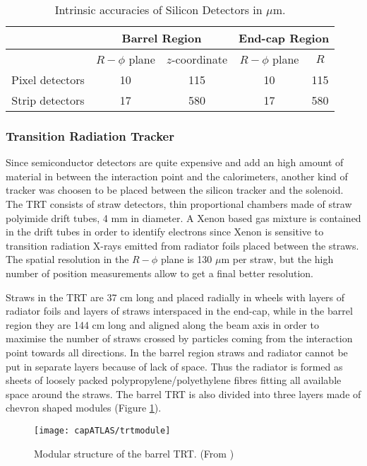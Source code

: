 \begin{table}[htb]\centering\begin{tabular}{ccccc}
&\multicolumn{2}{c}{Barrel Region} & \multicolumn{2}{c}{End-cap Region}  \\\midrule
&$R-\phi$ plane& $z$-coordinate& $R-\phi$ plane& $R$\\\midrule
Pixel detectors& 10 & 115& 10 & 115 \\\midrule
Strip detectors& 17 & 580 & 17 & 580\\\hline\hline
\end{tabular}\caption{Intrinsic accuracies of Silicon Detectors in $\mu$m.}\label{tab:sct} \end{table}


\subsubsection{Transition Radiation Tracker}
Since semiconductor detectors are quite expensive and add an high amount of material in between the interaction point and the calorimeters, another kind of tracker was choosen to be placed between the silicon tracker and the solenoid. The TRT consists of straw detectors, thin proportional chambers made of straw polyimide drift tubes, 4 mm in diameter. A Xenon based gas mixture is contained in the drift tubes in order to identify electrons since Xenon is sensitive to transition radiation X-rays emitted from  radiator foils placed between the straws. The spatial resolution in the $R-\phi$ plane is 130 $\mu$m per straw, but the high number of position measurements allow to get a final better resolution.

Straws in the TRT are 37 cm long and placed radially in wheels with layers of radiator foils and layers of straws interspaced in the end-cap, while in the barrel region they are 144 cm long and aligned along the beam axis in order to maximise the number of straws crossed by particles coming from the interaction point towards all directions. In the barrel region straws and radiator cannot be put in separate layers because of lack of space. Thus the radiator is formed as sheets of loosely packed polypropylene/polyethylene fibres fitting all available space around the straws. The barrel TRT is also divided into three layers made of chevron shaped modules (Figure \ref{trtmod}). 
\begin{figure}[htb]\begin{center}
\texttt{[image: capATLAS/trtmodule]}\caption{Modular structure of the barrel TRT. (From \cite{hep})}\label{trtmod}
\end{center}\end{figure}

